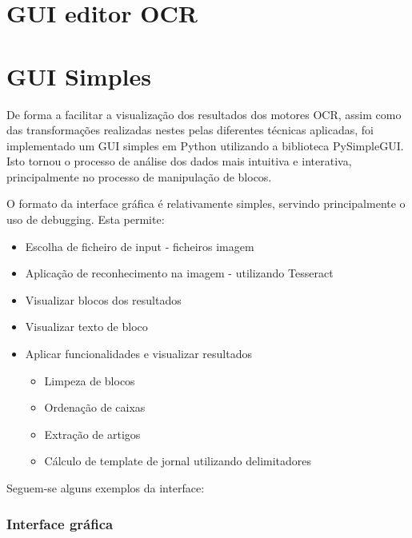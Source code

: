 \section{GUI editor OCR}
\label{contribution_ocr_editor}


\section{GUI Simples}
\label{gui_simples}

De forma a facilitar a visualização dos resultados dos motores OCR, assim como das transformações realizadas nestes pelas diferentes técnicas aplicadas, foi implementado um GUI simples em Python utilizando a biblioteca PySimpleGUI. Isto tornou o processo de análise dos dados mais intuitiva e interativa, principalmente no processo de manipulação de blocos.

O formato da interface gráfica é relativamente simples, servindo principalmente o uso de debugging. Esta permite:

\begin{itemize}\setlength\itemsep{0.05cm}
    \item Escolha de ficheiro de input - ficheiros imagem
    \item Aplicação de reconhecimento na imagem - utilizando Tesseract
    \item Visualizar blocos dos resultados
    \item Visualizar texto de bloco
    \item Aplicar funcionalidades e visualizar resultados
    \begin{itemize}
        \item Limpeza de blocos
        \item Ordenação de caixas
        \item Extração de artigos
        \item Cálculo de template de jornal utilizando delimitadores
    \end{itemize}
\end{itemize}

Seguem-se alguns exemplos da interface:

\subsubsection{Interface gráfica}

